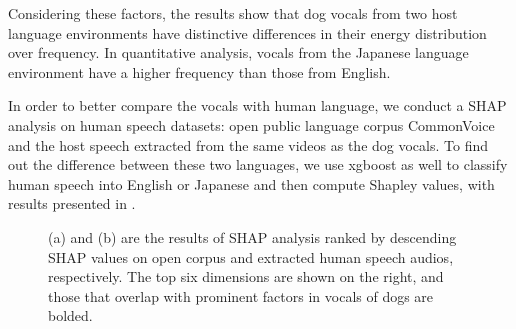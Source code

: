 

Considering these factors, the results show that dog vocals from two host language environments have distinctive differences in their energy distribution over frequency. In quantitative analysis, vocals from the Japanese language environment have a higher frequency than those from English.

In order to better compare the vocals with human language, we conduct a SHAP analysis on 
human speech datasets: open public language corpus CommonVoice and the host speech 
extracted from the same videos as the dog vocals. 
To find out the difference between these two languages, we use xgboost as well to classify 
human speech into English or Japanese and then compute Shapley values, 
with results presented in .

\begin{figure}[th]
	\centering
	\caption{(a) and (b) are the results of SHAP analysis ranked by descending SHAP values on open corpus and extracted human speech audios, respectively. The top six dimensions are shown on the right, 
and those that overlap with prominent factors in vocals of dogs are bolded.
}
	\label{fig:humanspeech}
\end{figure}

